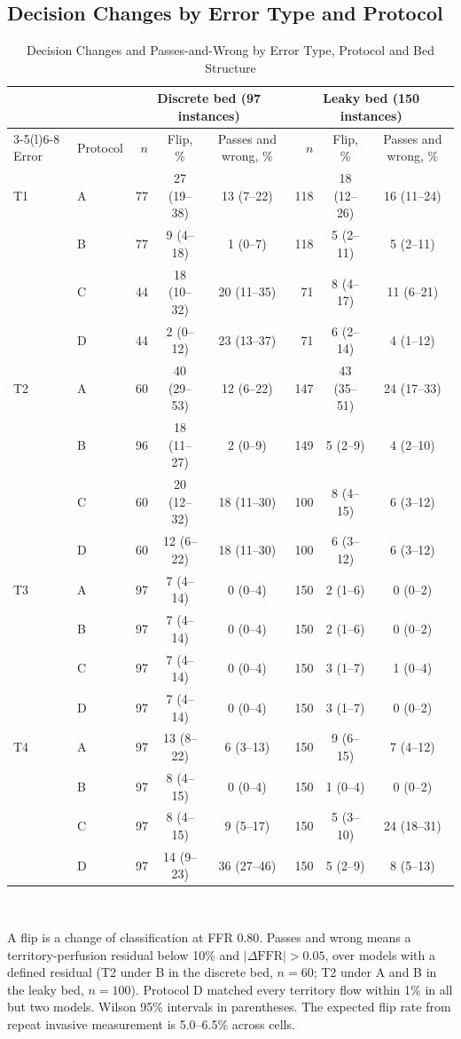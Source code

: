 \documentclass[journal,twoside,web]{ieeecolor}
\begin{document}
\subsection{Decision Changes by Error Type and Protocol}
\begin{table}[!t]
\caption{Decision Changes and Passes-and-Wrong by Error Type, Protocol and Bed Structure}
\label{tab:results}
\centering\footnotesize
\begin{tabular}{@{}llrccrcc@{}}
\toprule
 & & \multicolumn{3}{c}{Discrete bed (97 instances)} & \multicolumn{3}{c}{Leaky bed (150 instances)}\\
\cmidrule(lr){3-5}\cmidrule(l){6-8}
Error & Protocol & $n$ & Flip, \% & Passes and wrong, \% & $n$ & Flip, \% & Passes and wrong, \%\\
\midrule
T1 & A & 77 & 27 (19--38) & 13 (7--22) & 118 & 18 (12--26) & 16 (11--24) \\
 & B & 77 & 9 (4--18) & 1 (0--7) & 118 & 5 (2--11) & 5 (2--11) \\
 & C & 44 & 18 (10--32) & 20 (11--35) & 71 & 8 (4--17) & 11 (6--21) \\
 & D & 44 & 2 (0--12) & 23 (13--37) & 71 & 6 (2--14) & 4 (1--12) \\
\addlinespace[2pt]
T2 & A & 60 & 40 (29--53) & 12 (6--22) & 147 & 43 (35--51) & 24 (17--33) \\
 & B & 96 & 18 (11--27) & 2 (0--9) & 149 & 5 (2--9) & 4 (2--10) \\
 & C & 60 & 20 (12--32) & 18 (11--30) & 100 & 8 (4--15) & 6 (3--12) \\
 & D & 60 & 12 (6--22) & 18 (11--30) & 100 & 6 (3--12) & 6 (3--12) \\
\addlinespace[2pt]
T3 & A & 97 & 7 (4--14) & 0 (0--4) & 150 & 2 (1--6) & 0 (0--2) \\
 & B & 97 & 7 (4--14) & 0 (0--4) & 150 & 2 (1--6) & 0 (0--2) \\
 & C & 97 & 7 (4--14) & 0 (0--4) & 150 & 3 (1--7) & 1 (0--4) \\
 & D & 97 & 7 (4--14) & 0 (0--4) & 150 & 3 (1--7) & 0 (0--2) \\
\addlinespace[2pt]
T4 & A & 97 & 13 (8--22) & 6 (3--13) & 150 & 9 (6--15) & 7 (4--12) \\
 & B & 97 & 8 (4--15) & 0 (0--4) & 150 & 1 (0--4) & 0 (0--2) \\
 & C & 97 & 8 (4--15) & 9 (5--17) & 150 & 5 (3--10) & 24 (18--31) \\
 & D & 97 & 14 (9--23) & 36 (27--46) & 150 & 5 (2--9) & 8 (5--13) \\
\bottomrule
\end{tabular}
\\[2pt]
\parbox{\textwidth}{\footnotesize A flip is a change of classification at FFR 0.80. Passes and wrong means a territory-perfusion residual below 10\% and $|\Delta\mathrm{FFR}| > 0.05$, over models with a defined residual (T2 under B in the discrete
bed, $n = 60$; T2 under A and B in the leaky bed, $n = 100$). Protocol D matched every territory flow within 1\%
in all but two models. Wilson 95\% intervals in parentheses. The expected flip
rate from repeat invasive measurement is 5.0--6.5\% across cells.}
\end{table}
\end{document}
